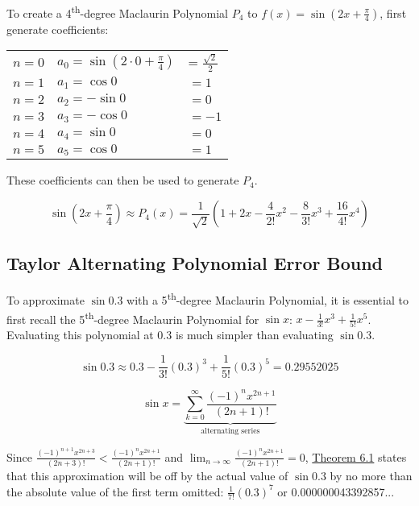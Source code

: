 \documentclass[10pt]{article}
\theoremstyle{definition}
\begin{document}
\newpage

To create a 4\textsuperscript{th}-degree Maclaurin Polynomial $P_4$ to $f(x)=\sin (2x+\frac{\pi}{4})$, first generate coefficients:

\begin{center}
\begin{tabular}{l l l}
$n=0$    &$a_0=\sin (2\cdot 0 +\frac{\pi}{4})$ &= $\frac{\sqrt{2}}{2}$ \\
$n=1$    &$a_1=\cos 0$ & $= 1$ \\
$n=2$    &$a_2=-\sin 0$ & $= 0$ \\
$n=3$    &$a_3=-\cos 0$ & $= -1$ \\
$n=4$    &$a_4=\sin 0$ & $= 0$ \\
$n=5$    &$a_5=\cos 0$ & $= 1$ \\
\end{tabular}
\end{center}

These coefficients can then be used to generate $P_4$.

\begin{equation}
\label{eq:1}
\sin \left(2x+\frac{\pi}{4}\right) \approx P_4(x)=\frac{1}{\sqrt{2}}\left(1+2x-\frac{4}{2!}x^2-\frac{8}{3!}x^3+\frac{16}{4!}x^4\right)
\end{equation}

\subsection{Taylor Alternating Polynomial Error Bound}

To approximate $\sin 0.3$ with a 5\textsuperscript{th}-degree Maclaurin Polynomial, it is essential to first recall the 5\textsuperscript{th}-degree Maclaurin Polynomial for $\sin x$: $x- \frac{1}{3!}x^3 + \frac{1}{5!}x^5$. Evaluating this polynomial at 0.3 is much simpler than evaluating $\sin 0.3$.

\[\sin 0.3 \approx 0.3-\frac{1}{3!}(0.3)^3+\frac{1}{5!}(0.3)^5 = 0.29552025\]

\[\sin x = \underbrace{\sum_{k=0}^{\infty} \frac{(-1)^nx^{2n+1}}{(2n+1)!}}_{\text{alternating series}}\]

Since $\frac{(-1)^{n+1}x^{2n+3}}{(2n+3)!}<\frac{(-1)^nx^{2n+1}}{(2n+1)!}$ and $\lim_{n \to \infty} \frac{(-1)^nx^{2n+1}}{(2n+1)!}=0$, \hyperlink{Error Bound}{Theorem 6.1} states that this approximation will be off by the actual value of $\sin 0.3$ by no more than the absolute value of the first term omitted: $\frac{1}{7!}(0.3)^7$ or 0.000000043392857...
\end{document}

